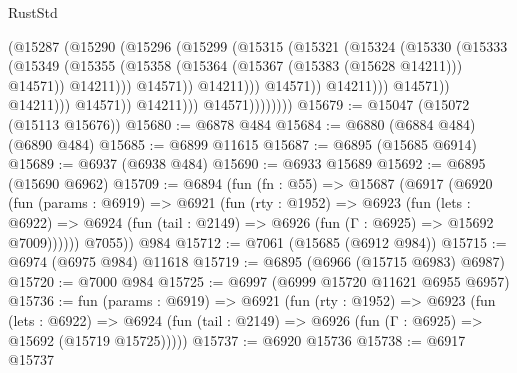 \begin{lexlean}{RustStd}
\begin{coremodule}
                                            (@15287
                                              (@15290
                                                (@15296
                                                  (@15299
                                                    (@15315
                                                      (@15321
                                                        (@15324
                                                          (@15330
                                                            (@15333
                                                              (@15349
                                                                (@15355
                                                                  (@15358
                                                                    (@15364
                                                                      (@15367
                                                                        (@15383 (@15628 @14211)))
                                                                      @14571))
                                                                  @14211)))
                                                            @14571))
                                                        @14211)))
                                                  @14571))
                                              @14211)))
                                        @14571))
                                    @14211)))
                              @14571))
                          @14211)))
                    @14571))))))))
@15679 := @15047 (@15072 (@15113 @15676))
@15680 := @6878 @484
@15684 := @6880 (@6884 @484) (@6890 @484)
@15685 := @6899 @11615
@15687 := @6895 (@15685 @6914)
@15689 := @6937 (@6938 @484)
@15690 := @6933 @15689
@15692 := @6895 (@15690 @6962)
@15709 := @6894
    (fun (fn : @55) =>
    @15687
      (@6917
        (@6920
          (fun (params : @6919) =>
          @6921
            (fun (rty : @1952) =>
            @6923
              (fun (lets : @6922) =>
              @6924 (fun (tail : @2149) => @6926 (fun (Γ : @6925) => @15692 @7009))))))
        @7055))
    @984
@15712 := @7061 (@15685 (@6912 @984))
@15715 := @6974 (@6975 @984) @11618
@15719 := @6895 (@6966 (@15715 @6983) @6987)
@15720 := @7000 @984
@15725 := @6997 (@6999 @15720 @11621 @6955 @6957)
@15736 := fun (params : @6919) =>
  @6921
    (fun (rty : @1952) =>
    @6923
      (fun (lets : @6922) =>
      @6924 (fun (tail : @2149) => @6926 (fun (Γ : @6925) => @15692 (@15719 @15725)))))
@15737 := @6920 @15736
@15738 := @6917 @15737

\end{coremodule}
\end{lexlean}
